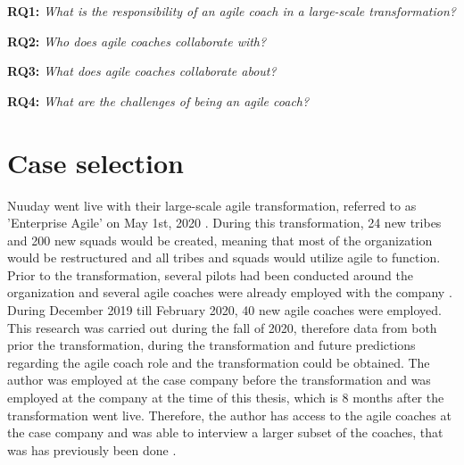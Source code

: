 \documentclass[11pt,a4paper]{report}
\begin{document}
\textbf{RQ1:} \emph{What is the responsibility of an agile coach in a large-scale transformation?}

\textbf{RQ2:} \emph{Who does agile coaches collaborate with?}

\textbf{RQ3:} \emph{What does agile coaches collaborate about?}

\textbf{RQ4:} \emph{What are the challenges of being an agile coach?}

\section{Case selection}
Nuuday went live with their large-scale agile transformation, referred to as 'Enterprise Agile' on May 1st, 2020 \cite{HenrikNuudayPresentation}. During this transformation, 24 new tribes and 200 new squads would be created, meaning that most of the organization would be restructured and all tribes and squads would utilize agile to function. Prior to the transformation, several pilots had been conducted around the organization and several agile coaches were already employed with the company \cite{HenrikNuudayPresentation}. During December 2019 till February 2020, 40 new agile coaches were employed. This research was carried out during the fall of 2020, therefore data from both prior the transformation, during the transformation and future predictions regarding the agile coach role and the transformation could be obtained.\newline
The author was employed at the case company before the transformation and was employed at the company at the time of this thesis, which is 8 months after the transformation went live. Therefore, the author has access to the agile coaches at the case company and was able to interview a larger subset of the coaches, that was has previously been done \cite{althoff2019qualitative}. 
\end{document}
